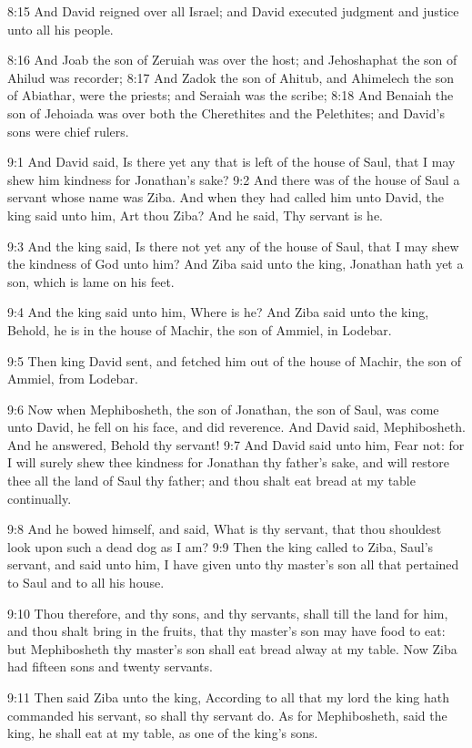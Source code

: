 8:15 And David reigned over all Israel; and David executed judgment
and justice unto all his people.

8:16 And Joab the son of Zeruiah was over the host; and Jehoshaphat
the son of Ahilud was recorder; 8:17 And Zadok the son of Ahitub, and
Ahimelech the son of Abiathar, were the priests; and Seraiah was the
scribe; 8:18 And Benaiah the son of Jehoiada was over both the
Cherethites and the Pelethites; and David's sons were chief rulers.

9:1 And David said, Is there yet any that is left of the house of
Saul, that I may shew him kindness for Jonathan's sake?  9:2 And there
was of the house of Saul a servant whose name was Ziba. And when they
had called him unto David, the king said unto him, Art thou Ziba?  And
he said, Thy servant is he.

9:3 And the king said, Is there not yet any of the house of Saul, that
I may shew the kindness of God unto him? And Ziba said unto the king,
Jonathan hath yet a son, which is lame on his feet.

9:4 And the king said unto him, Where is he? And Ziba said unto the
king, Behold, he is in the house of Machir, the son of Ammiel, in
Lodebar.

9:5 Then king David sent, and fetched him out of the house of Machir,
the son of Ammiel, from Lodebar.

9:6 Now when Mephibosheth, the son of Jonathan, the son of Saul, was
come unto David, he fell on his face, and did reverence. And David
said, Mephibosheth. And he answered, Behold thy servant!  9:7 And
David said unto him, Fear not: for I will surely shew thee kindness
for Jonathan thy father's sake, and will restore thee all the land of
Saul thy father; and thou shalt eat bread at my table continually.

9:8 And he bowed himself, and said, What is thy servant, that thou
shouldest look upon such a dead dog as I am?  9:9 Then the king called
to Ziba, Saul's servant, and said unto him, I have given unto thy
master's son all that pertained to Saul and to all his house.

9:10 Thou therefore, and thy sons, and thy servants, shall till the
land for him, and thou shalt bring in the fruits, that thy master's
son may have food to eat: but Mephibosheth thy master's son shall eat
bread alway at my table. Now Ziba had fifteen sons and twenty
servants.

9:11 Then said Ziba unto the king, According to all that my lord the
king hath commanded his servant, so shall thy servant do. As for
Mephibosheth, said the king, he shall eat at my table, as one of the
king's sons.


